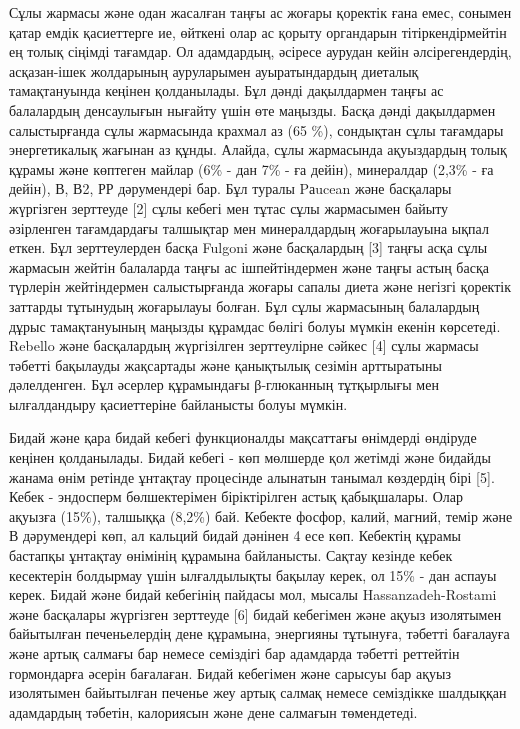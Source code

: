 Сұлы жармасы және одан жасалған таңғы ас жоғары қоректік ғана емес,
сонымен қатар емдік қасиеттерге ие, өйткені олар ас қорыту органдарын
тітіркендірмейтін ең толық сіңімді тағамдар. Ол адамдардың, әсіресе
аурудан кейін әлсірегендердің, асқазан-ішек жолдарының ауруларымен
ауыратындардың диеталық тамақтануында кеңінен қолданылады. Бұл дәнді
дақылдармен таңғы ас балалардың денсаулығын нығайту үшін өте маңызды.
Басқа дәнді дақылдармен салыстырғанда сұлы жармасында крахмал аз (65
\%), сондықтан сұлы тағамдары энергетикалық жағынан аз құнды. Алайда,
сұлы жармасында ақуыздардың толық құрамы және көптеген майлар (6\% - дан
7\% - ға дейін), минералдар (2,3\% - ға дейін), В, В2, РР дәрумендері
бар. Бұл туралы Pаucean және басқалары жүргізген зерттеуде {[}2{]} сұлы
кебегі мен тұтас сұлы жармасымен байыту әзірленген тағамдардағы
талшықтар мен минералдардың жоғарылауына ықпал еткен. Бұл зерттеулерден
басқа Fulgoni және басқалардың {[}3{]} таңғы асқа сұлы жармасын жейтін
балаларда таңғы ас ішпейтіндермен және таңғы астың басқа түрлерін
жейтіндермен салыстырғанда жоғары сапалы диета және негізгі қоректік
заттарды тұтынудың жоғарылауы болған. Бұл сұлы жармасының балалардың
дұрыс тамақтануының маңызды құрамдас бөлігі болуы мүмкін екенін
көрсетеді. Rebello және басқалардың жүргізілген зерттеулірне сәйкес
{[}4{]} сұлы жармасы тәбетті бақылауды жақсартады және қанықтылық
сезімін арттыратыны дәлелденген. Бұл әсерлер құрамындағы β-глюканның
тұтқырлығы мен ылғалдандыру қасиеттеріне байланысты болуы мүмкін.

Бидай және қара бидай кебегі функционалды мақсаттағы өнімдерді өндіруде
кеңінен қолданылады. Бидай кебегі - көп мөлшерде қол жетімді және
бидайды жанама өнім ретінде ұнтақтау процесінде алынатын танымал
көздердің бірі {[}5{]}. Кебек - эндосперм бөлшектерімен біріктірілген
астық қабықшалары. Олар ақуызға (15\%), талшыққа (8,2\%) бай. Кебекте
фосфор, калий, магний, темір және В дәрумендері көп, ал кальций бидай
дәнінен 4 есе көп. Кебектің құрамы бастапқы ұнтақтау өнімінің құрамына
байланысты. Сақтау кезінде кебек кесектерін болдырмау үшін ылғалдылықты
бақылау керек, ол 15\% - дан аспауы керек. Бидай және бидай кебегінің
пайдасы мол, мысалы Hassanzadeh-Rostami және басқалары жүргізген
зерттеуде {[}6{]} бидай кебегімен және ақуыз изолятымен байытылған
печеньелердің дене құрамына, энергияны тұтынуға, тәбетті бағалауға және
артық салмағы бар немесе семіздігі бар адамдарда тәбетті реттейтін
гормондарға әсерін бағалаған. Бидай кебегімен және сарысуы бар ақуыз
изолятымен байытылған печенье жеу артық салмақ немесе семіздікке
шалдыққан адамдардың тәбетін, калориясын және дене салмағын төмендетеді.

